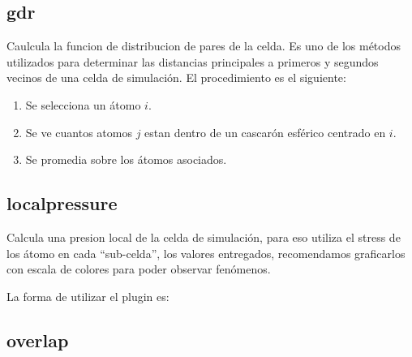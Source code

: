 \subsection{gdr}
Caulcula la funcion de distribucion de pares de la celda. Es uno de los
m\'etodos utilizados para determinar las distancias principales a primeros y
segundos vecinos de una celda de simulaci\'on. El procedimiento es el siguiente:
\begin{enumerate}
 \item Se selecciona un \'atomo $i$.
 \item Se ve cuantos atomos $j$ estan dentro de un cascar\'on esf\'erico
centrado en $i$.
 \item Se promedia sobre los \'atomos asociados.
\end{enumerate}


\subsection{localpressure}

Calcula una presion local de la celda de simulaci\'on, para eso utiliza el
stress de los \'atomo en cada ``sub-celda'', los valores entregados,
recomendamos graficarlos con escala de colores para poder observar fen\'omenos. 

La forma de utilizar el plugin es:

\subsection{overlap}

